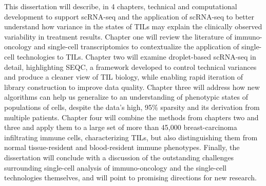 This dissertation will describe, in 4 chapters, technical and computational development to support scRNA-seq and the application of scRNA-seq to better understand how variance in the states of TILs may explain the clinically observed variability in treatment results.
Chapter one will review the literature of immuno-oncology and single-cell transcriptomics to contextualize the application of single-cell technologies to TILs.
Chapter two will examine droplet-based scRNA-seq in detail, highlighting SEQC, a framework developed to control technical variances and produce a cleaner view of TIL biology, while enabling rapid iteration of library construction to improve data quality. 
Chapter three will address how new algorithms can help us generalize to an understanding of phenotypic states of populations of cells, despite the data's high, 95\% sparsity and its derivation from multiple patients.  
Chapter four will combine the methods from chapters two and three and apply them to a large set of more than 45,000 breast-carcinoma infiltrating immune cells, characterizing TILs, but also distinguishing them from normal tissue-resident and blood-resident immune phenotypes.
Finally, the dissertation will conclude with a discussion of the outstanding challenges surrounding single-cell analysis of immuno-oncology and the single-cell technologies themselves, and will point to promising directions for new research.


